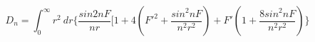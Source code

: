 \begin{equation}
D_n=\int_0^\infty r^2~dr \{ \frac{sin2nF}{nr} [ 1+ 4(F'^2 +\frac{sin^2nF}{n^2 r^2}) +F' (1+ \frac{8 sin^2nF}{n^2 r^2}) \}
\end{equation}


